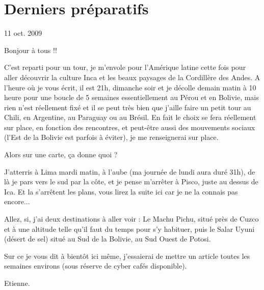 \section{Derniers préparatifs}

11 oct. 2009

\begin{multicols}{2}

Bonjour à tous !!

C'est reparti pour un tour, je m'envole pour l'Amérique latine cette fois pour aller découvrir la culture Inca et les beaux paysages de la Cordillère des Andes. A l'heure où je vous écrit, il est 21h, dimanche soir et je décolle demain matin à 10 heure pour une boucle de 5 semaines essentiellement au Pérou et en Bolivie, mais rien n'est réellement fixé et il se peut très bien que j'aille faire un petit tour au Chili, en Argentine, au Paraguay ou au Brésil. En fait le choix se fera réellement sur place, en fonction des rencontres, et peut-être aussi des mouvements sociaux (l'Est de la Bolivie est parfois à éviter), je me renseignerai sur place.

Alors sur une carte, ça donne quoi ?


J'atterris à Lima mardi matin, à l'aube (ma journée de lundi aura duré 31h), de là je pars vers le sud par la côte, et je pense m'arrêter à Pisco, juste au dessus de Ica. Et la s'arrêtent les plans, vous lirez la suite ici car je ne la connais pas encore...

Allez, si, j'ai deux destinations à aller voir : Le Machu Pichu, situé près de Cuzco et à une altitude telle qu'il faut du temps pour s'y habituer, puis le Salar Uyuni (désert de sel) situé au Sud de la Bolivie, au Sud Ouest de Potosi.

Sur ce je vous dit à bientôt ici même, j'essaierai de mettre un article toutes les semaines environs (sous réserve de cyber cafés disponible).

Etienne.

\end{multicols}


